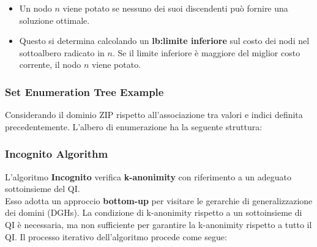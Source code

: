 \documentclass{report}
\begin{document}
\begin{itemize}
    \item Un nodo $n$ viene potato se nessuno dei suoi discendenti può fornire una soluzione ottimale.
    \item Questo si determina calcolando un \textbf{lb:limite inferiore} sul costo dei nodi nel sottoalbero radicato in $n$. 
    Se il limite inferiore è maggiore del miglior costo corrente, il nodo $n$ viene potato.
\end{itemize}

\subsubsection{Set Enumeration Tree Example}
Considerando il dominio ZIP rispetto all'associazione tra valori e indici definita precedentemente. L'albero di enumerazione ha la seguente struttura:

\begin{center}
\end{center}

\subsubsection{Incognito Algorithm}
L'algoritmo \textbf{Incognito} verifica \textbf{k-anonimity} con riferimento a un adeguato sottoinsieme del QI. \\ 
Esso adotta un approccio \textbf{bottom-up} per visitare le gerarchie di generalizzazione dei domini (DGHs). 
La condizione di k-anonimity rispetto a un sottoinsieme di QI è necessaria, ma non sufficiente per garantire la k-anonimity rispetto a tutto il QI. 
Il processo iterativo dell'algoritmo procede come segue:
\end{document}
